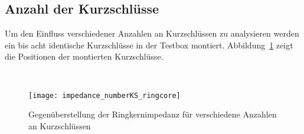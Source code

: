 \subsection{Anzahl der Kurzschl\"usse}
Um den Einfluss verschiedener Anzahlen an Kurzschl\"ussen zu analysieren werden ein bis acht identische Kurzschl\"usse in der Testbox montiert. Abbildung~\ref{fig:ringcorenumberCST} zeigt die Positionen der montierten Kurzschl\"usse.
\begin{figure}[htb]
	\centering
	\hspace{0.0065\textwidth}
	\hspace{0.0065\textwidth}
	\hspace{0.0065\textwidth}
	\\
	\hspace{0.0065\textwidth}
	\hspace{0.0065\textwidth}
	\hspace{0.0065\textwidth}
	\label{fig:ringcorenumberCST}
\end{figure}
\par
{}  

\begin{figure}[htb]
	\centering
	\texttt{[image: impedance\_numberKS\_ringcore]}
	\caption{Gegen\"uberstellung der Ringkernimpedanz f\"ur verschiedene Anzahlen an Kurzschl\"ussen}
	\label{fig:ringcorenumber}
\end{figure}



